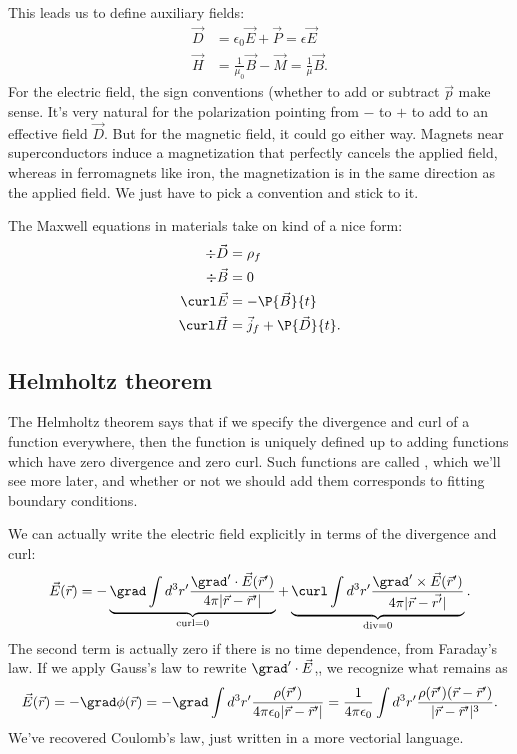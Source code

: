 This leads us to define auxiliary fields:
\begin{align}
    \vec D &= \epsilon_0 \vec E + \vec P = \epsilon \vec{E}\\
    \vec H &= \frac{1}{\mu_0} \vec{B} - \vec M  = \frac{1}{\mu} \vec{B}.
\end{align}
For the electric field, the sign conventions (whether to add or subtract $\vec{p}$ make sense. It's very natural for the polarization pointing from $-$ to $+$ to add to an effective field $\vec{D}$. But for the magnetic field, it could go either way. Magnets near superconductors induce a magnetization that perfectly cancels the applied field, whereas in ferromagnets like iron, the magnetization is in the same direction as the applied field. We just have to pick a convention and stick to it.

The Maxwell equations in materials take on kind of a nice form:
\begin{align}
    \div \vec{D} &= \rho_f\\
    \div \vec{B} &= 0\\
    \curl \vec{E} &= -\P{\vec{B}}{t}\\
    \curl \vec{H} &= \vec{j}_f + \P{\vec{D}}{t}.
\end{align}

\subsection*{Helmholtz theorem}
The Helmholtz theorem says that if we specify the divergence and curl of a function everywhere, then the function is uniquely defined up to adding functions which have zero divergence and zero curl. Such functions are called , which we'll see more later, and whether or not we should add them corresponds to fitting boundary conditions.

We can actually write the electric field explicitly in terms of the divergence and curl:
\begin{equation}
    \vec{E}(\vec{r}) = -\underbrace{\grad \int d^3 r' \frac{\grad' \cdot \vec{E}(\vec{r}')}{4\pi \abs{\vec{r}-\vec{r}'}}}_{\text{curl}=0} + \underbrace{\curl \int d^3 r' \frac{\grad'\times \vec{E}(\vec{r}')}{4\pi\abs{\vec{r}-\vec{r'}}}}_{\text{div}=0}.
\end{equation}
The second term is actually zero if there is no time dependence, from Faraday's law. If we apply Gauss's law to rewrite $\grad'\cdot \vec{E}$,, we recognize what remains as
\begin{equation}
    \vec{E}(\vec{r}) = -\grad \phi(\vec r) = -\grad \int d^3 r' \frac{\rho(\vec{r}')}{4\pi \epsilon_0 \abs{\vec{r} - \vec{r}'}} = \frac{1}{4\pi \epsilon_0} \int d^3 r' \frac{\rho(\vec{r}')(\vec{r}-\vec{r}')}{\abs{\vec{r} - \vec{r}'}^3}.
\end{equation}
We've recovered Coulomb's law, just written in a more vectorial language.

